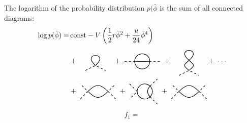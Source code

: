 \documentclass[11pt,a4paper]{article}
\begin{document}
The logarithm of the probability distribution $p(\bar{\phi}$ is the sum of all connected diagrams:
\begin{displaymath}
\begin{split}
    \log p(\bar{\phi}) = &\,
    \mathrm{const} -V \left(\frac{1}{2} r \bar{\phi}^2 + 
    \frac{u}{24} \bar{\phi}^4\right)\\
&+\ 
\begin{tikzpicture}[scale=0.5, baseline={([yshift=-.5ex]current bounding box.center)}]
    \draw[thick, dashed] (-1, -0.5) -- (0, 0) -- (1, -0.5);
    \draw[thick] (0, 0) .. controls (-1.5, 1.3) and (1.5, 1.3) .. (0, 0);
\end{tikzpicture}
\ + \ 
\begin{tikzpicture}[scale=0.5, baseline={([yshift=-.5ex]current bounding box.center)}]
    \draw[thick, dashed] (-1.75, 0) -- (-0.75, 0);
    \draw[thick] (-0.75, 0) -- (0.75, 0);
    \draw[thick, dashed] (1.75, 0) -- (0.75, 0);
    \draw[thick] (0, 0) circle (0.75cm);
\end{tikzpicture}
\ + \ 
\begin{tikzpicture}[scale=0.5, baseline={([yshift=-.5ex]current bounding box.center)}]
    \draw[thick, dashed] (-1, -0.5) -- (0, 0) -- (1, -0.5);
    \draw[thick] (0, 0) .. controls (0.6, 0.5).. (0, 1) .. 
    controls (-1.5, 2.3) and (1.5, 2.3) .. (0, 1) .. 
    controls (-0.6, 0.5) .. (0, 0) ;
\end{tikzpicture}
 \ + \ \cdots \\
&+\ 
\begin{tikzpicture}[scale=0.5, baseline={([yshift=-.5ex]current bounding box.center)}]
    \draw[thick, dashed] (-1.75, -0.75) -- (-1, 0) -- (-1.75, 0.75);
    \draw[thick, dashed] (1.75, -0.75) -- (1, 0) -- (1.75, 0.75);
    \draw[thick] (-1, 0) .. controls (-0.2, 0.8) and (0.2, 0.8) .. (1, 0) .. 
    controls (0.2, -0.8) and (-0.2, -0.8) .. (-1, 0);
\end{tikzpicture}
\ + \ 
\begin{tikzpicture}[scale=0.5, baseline={([yshift=-.5ex]current bounding box.center)}]
    \draw[thick, dashed] (-1.5, 0.75) -- (-0.75, 0) -- (-1.5, -0.75) ;
    \draw[thick] (0, 0) circle (0.75cm);
    \draw[thick, dashed] (0.53, 0.53) -- (1.25, 1.25);
    \draw[thick, dashed] (0.53, -0.53) -- (1.25, -1.25);
    \draw[thick] (0.53, -0.53) .. controls (0.2, -0.2) 
    and (0.2, 0.2) .. (0.53, 0.53);
\end{tikzpicture}
\ + \ 
\begin{tikzpicture}[scale=0.5, baseline={([yshift=-.5ex]current bounding box.center)}]
    \draw[thick, dashed] (-1.75, -0.75) -- (-1, 0) -- (-1.75, 0.75);
    \draw[thick, dashed] (1.75, -0.75) -- (1, 0) -- (1.75, 0.75);
    \draw[thick] (-1, 0) .. controls (-0.2, 0.8) and (0.2, 0.8) .. (1, 0) .. 
    controls (0.2, -0.8) and (-0.2, -0.8) .. (-1, 0);
\end{tikzpicture}
\end{split}
\end{displaymath}

\begin{equation}
\label{eq:f_functions}
f_1 = 
\end{equation}
\end{document}
